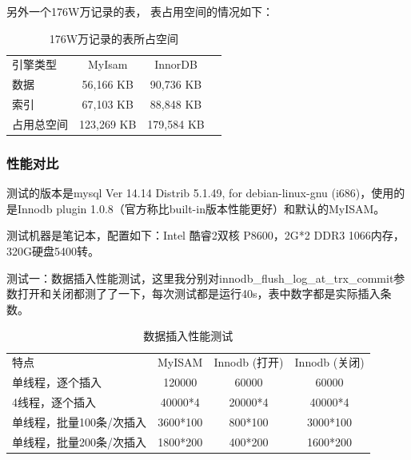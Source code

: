 \documentclass[UTF8]{ctexart}
\begin{document}
另外一个176W万记录的表， 表占用空间的情况如下：
\begin{table}[]
\caption{176W万记录的表所占空间}
\vspace{20pt}
\centering
\begin{tabular}{|l|c|c|c|}
\hline
引擎类型        &        MyIsam &             InnorDB\\
数据           &       56,166 KB    &      90,736 KB\\
索引           &       67,103 KB   &       88,848 KB\\
占用总空间      &  123,269 KB     &   179,584 KB\\
 \hline       
 \end{tabular}
 \label{bs5}
\end{table}
\subsubsection{性能对比}
测试的版本是mysql  Ver 14.14 Distrib 5.1.49, for debian-linux-gnu (i686)，使用的是Innodb plugin 1.0.8（官方称比built-in版本性能更好）和默认的MyISAM。

测试机器是笔记本，配置如下：Intel 酷睿2双核 P8600，2G*2 DDR3 1066内存，320G硬盘5400转。

测试一：数据插入性能测试，这里我分别对innodb\_flush\_log\_at\_trx\_commit参数打开和关闭都测了了一下，每次测试都是运行40s，表中数字都是实际插入条数。
\begin{table}[]
\caption{数据插入性能测试}
\vspace{20pt}
\centering
\begin{tabular}{|l|c|c|c|}
\hline
特点           &   MyISAM           &      Innodb (打开)  &    Innodb (关闭)\\

单线程，逐个插入     &    120000    &             60000         &     60000\\

4线程，逐个插入      &    40000*4    &            20000*4       &     40000*4\\

单线程，批量100条/次插入&  3600*100   &            800*100      &      3000*100\\

单线程，批量200条/次插入 & 1800*200    &           400*200      &      1600*200\\
\hline       
\end{tabular}
\label{bs5}
\end{table}
\end{document}
